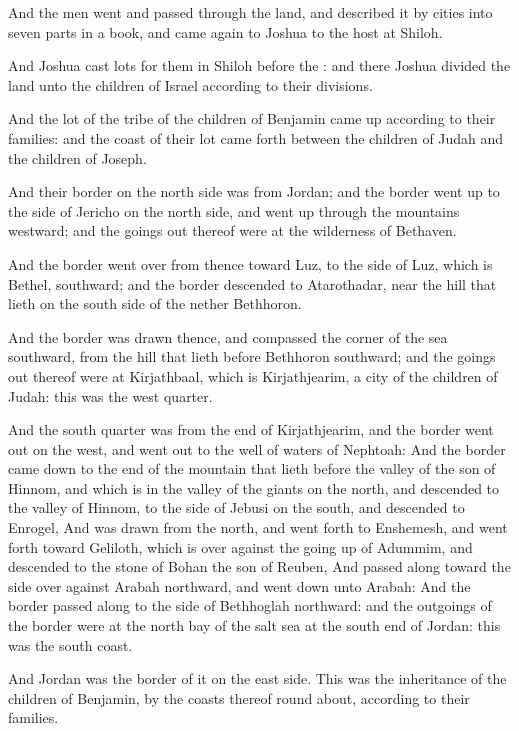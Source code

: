 \verse And the men went and passed through the land, and described it by cities into seven parts in a book, and came again to Joshua to the host at Shiloh.

\verse And Joshua cast lots for them in Shiloh before the \LORD: and there Joshua divided the land unto the children of Israel according to their divisions.

\verse And the lot of the tribe of the children of Benjamin came up according to their families: and the coast of their lot came forth between the children of Judah and the children of Joseph.

\verse And their border on the north side was from Jordan; and the border went up to the side of Jericho on the north side, and went up through the mountains westward; and the goings out thereof were at the wilderness of Bethaven.

\verse And the border went over from thence toward Luz, to the side of Luz, which is Bethel, southward; and the border descended to Atarothadar, near the hill that lieth on the south side of the nether Bethhoron.

\verse And the border was drawn thence, and compassed the corner of the sea southward, from the hill that lieth before Bethhoron southward; and the goings out thereof were at Kirjathbaal, which is Kirjathjearim, a city of the children of Judah: this was the west quarter.

\verse And the south quarter was from the end of Kirjathjearim, and the border went out on the west, and went out to the well of waters of Nephtoah: \verse And the border came down to the end of the mountain that lieth before the valley of the son of Hinnom, and which is in the valley of the giants on the north, and descended to the valley of Hinnom, to the side of Jebusi on the south, and descended to Enrogel, \verse And was drawn from the north, and went forth to Enshemesh, and went forth toward Geliloth, which is over against the going up of Adummim, and descended to the stone of Bohan the son of Reuben, \verse And passed along toward the side over against Arabah northward, and went down unto Arabah: \verse And the border passed along to the side of Bethhoglah northward: and the outgoings of the border were at the north bay of the salt sea at the south end of Jordan: this was the south coast.

\verse And Jordan was the border of it on the east side. This was the inheritance of the children of Benjamin, by the coasts thereof round about, according to their families.


